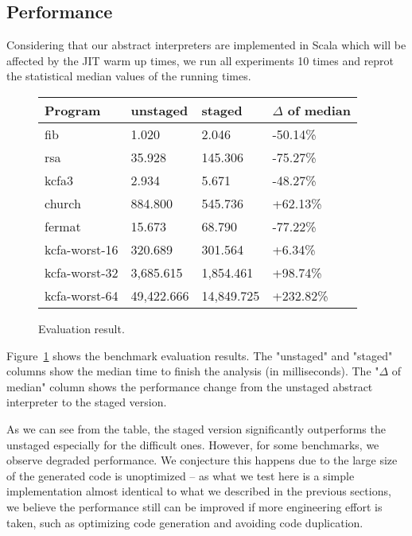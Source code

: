 \subsection{Performance}

Considering that our abstract interpreters are implemented in Scala which will be 
affected by the JIT warm up times, we run all experiments 10 times and reprot
the statistical median values of the running times.

\begin{figure}[h]
\begin{tabular}{@{}llll@{}}
\toprule
    Program            & unstaged   & staged     & $\Delta$ of median \\ \midrule
    fib                & 1.020      & 2.046      & -50.14\%          \\
    rsa                & 35.928     & 145.306    & -75.27\%          \\
    kcfa3              & 2.934      & 5.671      & -48.27\%          \\
    church             & 884.800    & 545.736    & +62.13\%          \\
    fermat             & 15.673     & 68.790     & -77.22\%          \\
    kcfa-worst-16      & 320.689    & 301.564    & +6.34\%           \\
    kcfa-worst-32      & 3,685.615  & 1,854.461  & +98.74\%          \\
    kcfa-worst-64      & 49,422.666 & 14,849.725 & +232.82\%         \\
    \bottomrule
\end{tabular}
\caption{Evaluation result.} \label{evaluation_result}
\end{figure}

Figure~\ref{evaluation_result} shows the benchmark evaluation results. The "unstaged" and "staged" columns
show the median time to finish the analysis (in milliseconds). The "$\Delta$ of median"
column shows the performance change from the unstaged abstract interpreter to the staged version.

As we can see from the table, the staged version significantly outperforms the unstaged especially 
for the difficult ones.
However, for some benchmarks, we observe degraded performance. 
We conjecture this happens due to the large size of the generated code is unoptimized -- 
as what we test here is a simple implementation almost identical to what we described in the previous sections,
we believe the performance still can be improved if more engineering effort is taken, 
such as optimizing code generation and avoiding code duplication.

